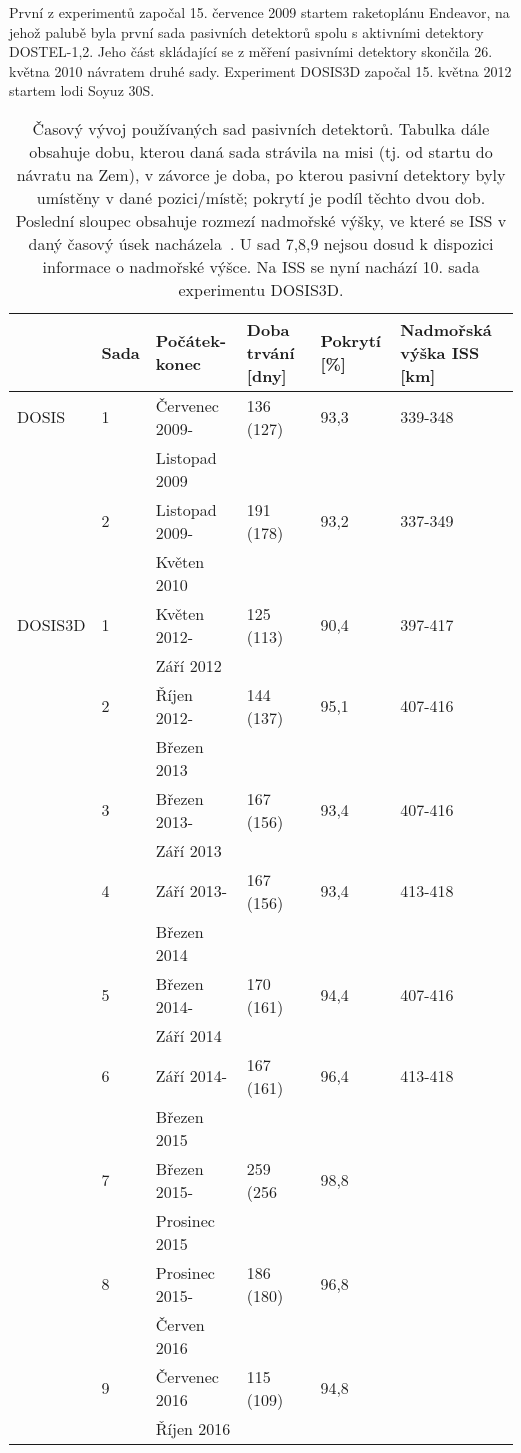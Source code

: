 První z experimentů započal 15. července 2009 startem raketoplánu Endeavor, na jehož palubě byla
první sada pasivních detektorů spolu s aktivními detektory \mbox{DOSTEL-1,2}. Jeho část skládající se z měření pasivními detektory skončila 26. května 2010 návratem druhé sady. Experiment DOSIS3D započal 15. května 2012 startem lodi Soyuz 30S. 
\begin{table}[ht]
  \centering
\footnotesize
  \caption{Časový vývoj používaných sad pasivních detektorů. Tabulka dále obsahuje dobu, kterou daná sada strávila na misi (tj. od startu do návratu na Zem), v závorce je doba, po kterou pasivní detektory byly umístěny v dané pozici/místě; pokrytí je podíl těchto dvou dob. Poslední sloupec obsahuje rozmezí nadmořské výšky, ve které se ISS v daný časový úsek nacházela~\cite{dosis}. U sad 7,8,9 nejsou dosud k dispozici informace o nadmořské výšce. Na ISS se nyní nachází 10. sada experimentu DOSIS3D.}
  \label{tab:dosis_timeline_passive}
  \begin{tabularx}{\textwidth}{llllll}
	\toprule
	&Sada&	Počátek-konec	&Doba trvání [dny]	&Pokrytí [\%]	&Nadmořská výška ISS [km]\\
	\midrule
DOSIS	&1	&Červenec 2009-	&136 (127)	&93,3	&339-348\\
		&	&Listopad 2009	&		    &       &       \\
		&2	&Listopad 2009-	&191 (178)	&93,2	&337-349\\
		&	&Květen 2010	&		    &       &       \\
DOSIS3D	&1	&Květen 2012-	&125 (113)	&90,4	&397-417\\
		&	&Září 2012		&	        &       &       \\
		&2	&Říjen 2012-	&144 (137)	&95,1	&407-416\\
		&	&Březen 2013	&		    &       &       \\
		&3	&Březen 2013-	&167 (156)	&93,4	&407-416\\
		&	&Září 2013		&	        &       &       \\
		&4	&Září 2013-		&167 (156)	&93,4	&413-418\\
		&	&Březen 2014	&		    &       &       \\
		&5	&Březen 2014-	&170 (161)	&94,4	&407-416\\
		&	&Září 2014		&	        &       &       \\
		&6	&Září 2014-		&167 (161)	&96,4	&413-418\\
		&	&Březen 2015	&			&		&		\\
		&7	&Březen 2015-	&259 (256	&98,8	&		\\
		&	&Prosinec 2015	&			&		&		\\
		&8	&Prosinec 2015- &186 (180)	&96,8	&		\\
		&	&Červen 2016	&			&		&		\\
		&9	&Červenec 2016	&115 (109)	&94,8	&		\\
		&	&Říjen 2016		&			&		&		\\
		\bottomrule
  \end{tabularx}
\end{table}
